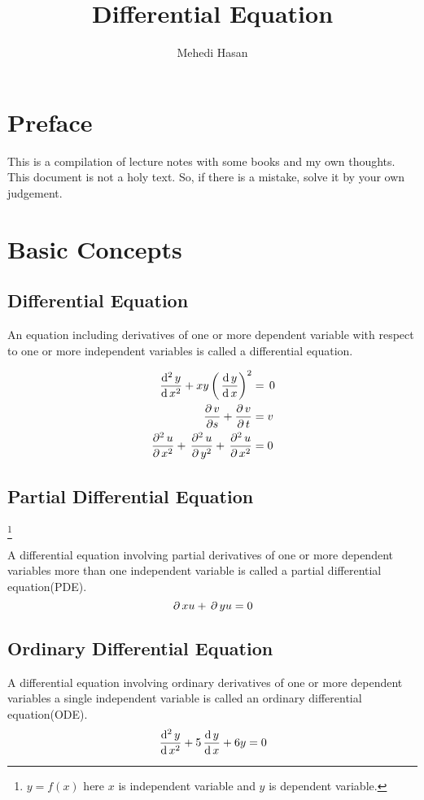 \documentclass[12pt,oneside,a4paper]{article}
\newcommand\blfootnote[1]{%
  \begingroup
  \renewcommand\thefootnote{}\footnote{#1}%
  \addtocounter{footnote}{-1}%
  \endgroup
}
\begin{document}
\title{Differential Equation}
\author{Mehedi Hasan}
\maketitle
\newpage
\section*{Preface}
This is a compilation of lecture notes with some books and my own thoughts. This document is not a holy text. So, if there is a mistake, solve it by your own judgement.
\newpage
\tableofcontents
\newpage
{}
\section{Basic Concepts}
\subsection{Differential Equation}
An equation including derivatives of one or more dependent variable with respect to one or more independent variables is called a differential equation.
\begin{ex}
    \begin{align*}
        \,\frac{\mathrm{d}^{2}\, y}{\mathrm{d}\, x^{2}}+xy\left(\,\frac{\mathrm{d}\,y}{\mathrm{d}\,x}\right)^2                             & =\,0 \\
        \frac{\partial \, v}{\partial s}+\frac{\partial\,v}{\partial\,t} & =v   \\
        \,\frac{\partial^{2}\, u}{\partial\, x^{2}}+\,\frac{\partial^{2}\, u}{\partial\,y^{2}}+\,\frac{\partial^{2}\, u}{\partial\, x^{2}}                           & =0
    \end{align*}
\end{ex}
\subsection{Partial Differential Equation}
\blfootnote{$ y=f(x) $ here $ x  $ is independent variable and $ y $ is dependent variable.}
A differential equation involving partial derivatives of one or more dependent variables \wrt more than one independent variable is called a partial differential equation(PDE).
\[
    \,\partial\, x{u}+\,\partial\, y{u}=0
\]
\subsection{Ordinary Differential Equation}
A differential equation involving ordinary derivatives of one or more dependent variables \wrt a single independent variable is called an ordinary differential equation(ODE).
\[
    \,\frac{\mathrm{d}^{2}\, y}{\mathrm{d}\, x^{2}}+5\,\frac{\mathrm{d}\,y}{\mathrm{d}\,x}+6y=0
\]
\end{document}
